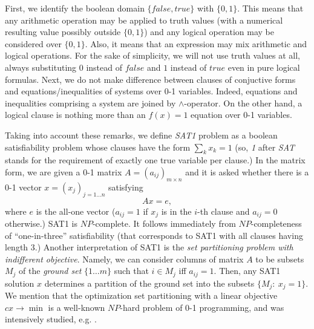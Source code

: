 \documentclass[11pt]{article}
\begin{document}
First, we identify the boolean domain $\{false,true\}$ with $\{0,1\}$. This means that any arithmetic operation may be applied to truth values (with a numerical resulting value possibly outside $\{0,1\}$) and any logical operation may be considered over $\{0,1\}$. Also, it means that an expression may mix arithmetic and logical operations. For the sake of simplicity, we will not use truth values at all, always substituting $0$ instead of $false$ and $1$ instead of $true$ even in pure logical formulas. Next, we do not make difference between clauses of conjuctive forms and equations/inequalities of systems over 0-1 variables. Indeed, equations and inequalities comprising a system are joined by $\land$-operator. On the other hand, a logical clause is nothing more than an $f(x)=1$ equation over 0-1 variables.

Taking into account these remarks, we define {\em SAT1\/} problem as a boolean satisfiability problem whose clauses have the form $\sum_k x_k =1$ (so, {\em 1\/} after {\em SAT\/} stands for the requirement of exactly one true variable per clause.) In the matrix form, we are given a 0-1 matrix $A=(a_{ij})_{m \times n}$ and it is asked whether there is a 0-1 vector $x=(x_j)_{j=1 \ldots n}$ satisfying
\begin{equation}
\label{eq:sat1}
Ax=e,
\end{equation}
where $e$ is the all-one vector ($a_{ij}=1$ if $x_j$ is in the $i$-th clause and $a_{ij}=0$ otherwise.) SAT1 is $NP$-complete. It follows immediately from $NP$-completeness of ``one-in-three'' satisfiability \cite{S78} (that corresponds to SAT1 with all clauses having length 3.) Another interpretation of SAT1 is the {\em set partitioning problem with indifferent objective}. Namely, we can consider columns of matrix $A$ to be subsets $M_j$ of the {\em ground set\/} $\{1 \ldots m\}$ such that $i \in M_j$ iff $a_{ij}=1$. Then, any SAT1 solution $x$ determines a partition of the ground set into the subsets $\{M_j: \ x_j=1\}$. We mention that the optimization set partitioning with a linear objective $cx \to \min$ is a well-known $NP$-hard problem of 0-1 programming, and was intensively studied, e.g. \cite{BP76,HP93,L94}.
\end{document}
